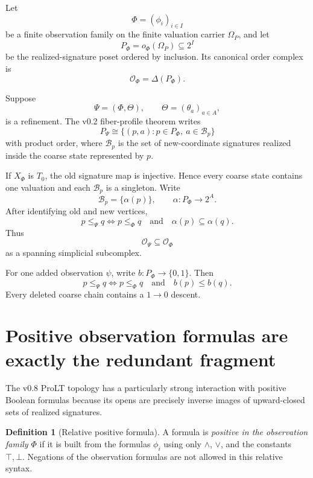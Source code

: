 \documentclass[11pt]{article}
\theoremstyle{definition}
\newtheorem{definition}[theorem]{Definition}
\newcommand{\Om}{\Omega_P}
\newcommand{\OX}{\mathcal O}
\begin{document}
Let
\[
\Phi=(\phi_i)_{i\in I}
\]
be a finite observation family on the finite valuation carrier $\Om$, and let
\[
P_\Phi=o_\Phi(\Om)\subseteq 2^I
\]
be the realized-signature poset ordered by inclusion. Its canonical order complex is
\[
\OX_\Phi=\Delta(P_\Phi).
\]

Suppose
\[
\Psi=(\Phi,\Theta),\qquad \Theta=(\theta_a)_{a\in A},
\]
is a refinement. The v0.2 fiber-profile theorem writes
\[
P_\Psi\cong\{(p,a):p\in P_\Phi,\ a\in\mathcal B_p\}
\]
with product order, where $\mathcal B_p$ is the set of new-coordinate signatures realized inside the coarse state represented by $p$.

If $X_\Phi$ is $T_0$, the old signature map is injective. Hence every coarse state contains one valuation and each $\mathcal B_p$ is a singleton. Write
\[
\mathcal B_p=\{\alpha(p)\},\qquad \alpha:P_\Phi\to 2^A.
\]
After identifying old and new vertices,
\begin{equation}\label{eq:fineorder}
p\le_\Psi q
\iff
p\le_\Phi q\quad\text{and}\quad \alpha(p)\subseteq\alpha(q).
\end{equation}
Thus
\[
\OX_\Psi\subseteq\OX_\Phi
\]
as a spanning simplicial subcomplex.

For one added observation $\psi$, write $b:P_\Phi\to\{0,1\}$. Then
\begin{equation}\label{eq:bitorder}
p\le_\Psi q
\iff
p\le_\Phi q\quad\text{and}\quad b(p)\le b(q).
\end{equation}
Every deleted coarse chain contains a $1\to0$ descent.

\section{Positive observation formulas are exactly the redundant fragment}

The v0.8 ProLT topology has a particularly strong interaction with positive Boolean formulas because its opens are precisely inverse images of upward-closed sets of realized signatures.

\begin{definition}[Relative positive formula]
A formula is \emph{positive in the observation family $\Phi$} if it is built from the formulas $\phi_i$ using only $\wedge$, $\vee$, and the constants $\top,\bot$. Negations of the observation formulas are not allowed in this relative syntax.
\end{definition}
\end{document}
